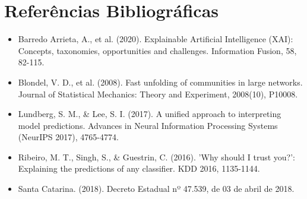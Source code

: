 \documentclass[10pt,a4paper,journal]{article}
\begin{document}
\section{Referências Bibliográficas}
\begin{itemize}
\item Barredo Arrieta, A., et al. (2020). Explainable Artificial Intelligence (XAI): Concepts, taxonomies, opportunities and challenges. Information Fusion, 58, 82-115.
\end{itemize}
\begin{itemize}
\item Blondel, V. D., et al. (2008). Fast unfolding of communities in large networks. Journal of Statistical Mechanics: Theory and Experiment, 2008(10), P10008.
\end{itemize}
\begin{itemize}
\item Lundberg, S. M., \& Lee, S. I. (2017). A unified approach to interpreting model predictions. Advances in Neural Information Processing Systems (NeurIPS 2017), 4765-4774.
\end{itemize}
\begin{itemize}
\item Ribeiro, M. T., Singh, S., \& Guestrin, C. (2016). 'Why should I trust you?': Explaining the predictions of any classifier. KDD 2016, 1135-1144.
\end{itemize}
\begin{itemize}
\item Santa Catarina. (2018). Decreto Estadual nº 47.539, de 03 de abril de 2018.
\end{itemize}
\end{document}
